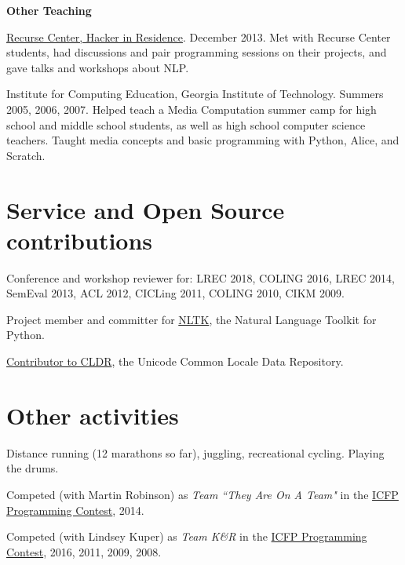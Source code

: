 \begin{itemize*}
\item{\textbf{Other Teaching}}
\begin{itemize*}
\item \href{https://www.recurse.com/residents#Alex-Rudnick}{Recurse Center,
Hacker in Residence}. December 2013. Met with Recurse Center students, had
discussions and pair programming sessions on their projects, and gave talks and
workshops about NLP.

\item Institute for Computing Education, Georgia Institute of Technology.
Summers 2005, 2006, 2007.
Helped teach a Media Computation summer camp for high school and middle school
students, as well as high school computer science teachers. Taught media
concepts and basic programming with Python, Alice, and Scratch.
\end{itemize*}
\end{itemize*}


\section*{Service and Open Source contributions}
\begin{itemize*}
\item Conference and workshop reviewer for: LREC 2018, COLING 2016, LREC 2014,
SemEval 2013, ACL 2012, CICLing 2011, COLING 2010, CIKM 2009.

\item Project member and committer for \href{http://nltk.org}{NLTK}, the
Natural Language Toolkit for Python.

\item \href{http://cldr.unicode.org/index/acknowledgments}{Contributor to
CLDR}, the Unicode Common Locale Data Repository.
\end{itemize*}

\section*{Other activities}

\begin{itemize*}

\item Distance running (12 marathons so far), juggling, recreational cycling.
Playing the drums.

\item Competed (with Martin Robinson) as {\em Team ``They Are On A Team"} in
the \href{http://www.icfpcontest.org}{ICFP Programming Contest}, 2014.

\item Competed (with Lindsey Kuper) as {\em Team K\&R} in the
  \href{http://www.icfpcontest.org}{ICFP Programming Contest}, 2016, 2011,
  2009, 2008.
\end{itemize*}
